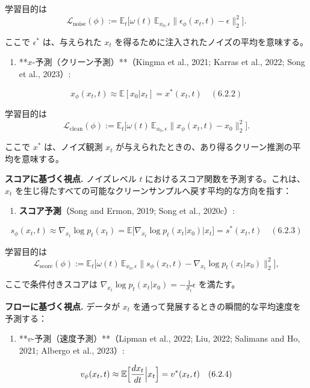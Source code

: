 学習目的は
\[
\mathcal{L}_{\mathrm{noise}}(\phi) := \mathbb{E}_t\bigl[\omega(t)\,\mathbb{E}_{x_0,\epsilon}\|\epsilon_\phi(x_t, t) - \epsilon\|_2^2\bigr].
\]

ここで $\epsilon^*$ は、与えられた $x_t$ を得るために注入されたノイズの平均を意味する。

\begin{enumerate}
\item **$x$-予測（クリーン予測）**（Kingma et al., 2021; Karras et al., 2022; Song et al., 2023）:
\end{enumerate}

\[
x_\phi(x_t, t) \approx \mathbb{E}[x_0|x_t] = x^*(x_t, t) \quad (6.2.2)
\]

学習目的は
\[
\mathcal{L}_{\mathrm{clean}}(\phi) := \mathbb{E}_t\bigl[\omega(t)\,\mathbb{E}_{x_0,\epsilon}\|x_\phi(x_t, t) - x_0\|_2^2\bigr].
\]

ここで $x^*$ は、ノイズ観測 $x_t$ が与えられたときの、あり得るクリーン推測の平均を意味する。

\textbf{スコアに基づく視点.} ノイズレベル $t$ におけるスコア関数を予測する。これは、$x_t$ を生じ得たすべての可能なクリーンサンプルへ戻す平均的な方向を指す：

\begin{enumerate}
\item \textbf{スコア予測}（Song and Ermon, 2019; Song et al., 2020c）:
\end{enumerate}

\[
s_\phi(x_t, t) \approx \nabla_{x_t}\log p_t(x_t) = \mathbb{E}\bigl[\nabla_{x_t}\log p_t(x_t|x_0)\big|x_t\bigr] = s^*(x_t, t) \quad (6.2.3)
\]

学習目的は
\[
\mathcal{L}_{\mathrm{score}}(\phi) := \mathbb{E}_t\bigl[\omega(t)\,\mathbb{E}_{x_0,\epsilon}\|s_\phi(x_t, t) - \nabla_{x_t}\log p_t(x_t|x_0)\|_2^2\bigr],
\]

ここで条件付きスコアは $\nabla_{x_t}\log p_t(x_t|x_0) = -\frac{1}{\sigma_t}\epsilon$ を満たす。

\textbf{フローに基づく視点.} データが $x_t$ を通って発展するときの瞬間的な平均速度を予測する：

\begin{enumerate}
\item **$v$-予測（速度予測）**（Lipman et al., 2022; Liu, 2022; Salimans and Ho, 2021; Albergo et al., 2023）:
\end{enumerate}

\[
v_\phi(x_t, t) \approx \mathbb{E}\Bigl[\frac{dx_t}{dt}\Big|x_t\Bigr] = v^*(x_t, t) \quad (6.2.4)
\]

